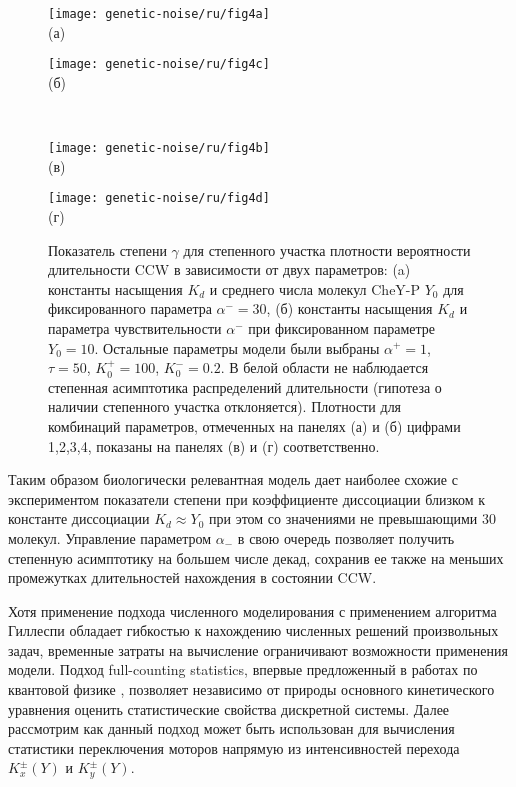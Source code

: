\begin{figure}[ht]
    \begin{minipage}[b][][b]{0.49\linewidth}\centering
        \texttt{[image: genetic-noise/ru/fig4a]} \\ (а)
    \end{minipage}
    \hfill
    \begin{minipage}[b][][b]{0.49\linewidth}\centering
        \texttt{[image: genetic-noise/ru/fig4c]} \\ (б)
    \end{minipage}\\
    \begin{minipage}[b][][b]{0.49\linewidth}\centering
        \texttt{[image: genetic-noise/ru/fig4b]} \\ (в)
    \end{minipage}
    \hfill
    \begin{minipage}[b][][b]{0.49\linewidth}\centering
        \texttt{[image: genetic-noise/ru/fig4d]} \\ (г)
    \end{minipage}
    \caption{
        Показатель степени $\gamma$ для степенного участка плотности вероятности длительности CCW в зависимости от двух параметров: (a) константы насыщения $K_d$ и среднего числа молекул CheY-P $Y_0$ для фиксированного параметра $\alpha^- = 30$, (б) константы насыщения $K_d$ и параметра чувствительности $\alpha^-$ при фиксированном параметре $Y_0 = 10$. Остальные параметры модели были выбраны $\alpha^+=1$, $\tau=50$, $K^+_0=100$, $K^-_0=0.2$. В белой области не наблюдается степенная асимптотика распределений длительности (гипотеза о наличии степенного участка отклоняется). Плотности для комбинаций параметров, отмеченных на панелях (а) и (б) цифрами 1,2,3,4, показаны на панелях (в) и (г) соответственно. 
    }\label{fig:pdf-gamma-grid-kd}
\end{figure}

Таким образом биологически релевантная модель дает наиболее схожие с экспериментом показатели степени при коэффициенте диссоциации близком к константе диссоциации $K_d \approx Y_0$ при этом со значениями не превышающими $30$ молекул. Управление параметром $\alpha_-$ в свою очередь позволяет получить степенную асимптотику на большем числе декад, сохранив ее также на меньших промежутках длительностей нахождения в состоянии CCW.

Хотя применение подхода численного моделирования с применением алгоритма Гиллеспи обладает гибкостью к нахождению численных решений произвольных задач, временные затраты на вычисление ограничивают возможности применения модели. Подход full-counting statistics, впервые предложенный в работах по квантовой физике \cite{levitov_electron_1996}, позволяет независимо от природы основного кинетического уравнения оценить статистические свойства дискретной системы. Далее рассмотрим как данный подход может быть использован для вычисления статистики переключения моторов напрямую из интенсивностей перехода $K_x^\pm(Y)$ и $K_y^\pm(Y)$.

